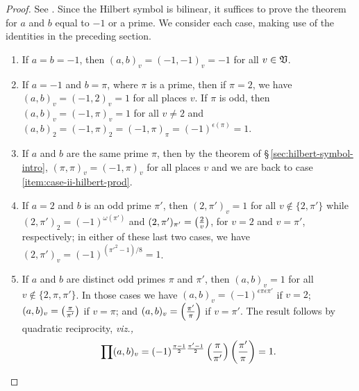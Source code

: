 \begin{proof}
    See \cite[p.~23]{weismann2006annotations}. Since the Hilbert symbol is
    bilinear, it suffices to prove the theorem for \(a\) and \(b\) equal to
    \(-1\) or a prime. We consider each case, making use of the identities in
    the preceding section.

    \smallskip

    \begin{enumerate}[nosep, label=(\roman*), wide]
        \item If \(a = b = -1\), then \((a, b)_v = (-1, -1)_v = -1\) for all \(v
        \in \mathfrak{V}\).
        \item If \(a = -1\) and \(b = \pi\), where \(\pi\) is a prime, then if
        \(\pi = 2\), we have \((a, b)_v = (-1, 2)_v = 1\) for all places \(v\).
        If \(\pi\) is odd, then \((a, b)_v = (-1, \pi)_v = 1\) for all \(v \neq
        2\) and \((a, b)_2 = (-1, \pi)_2 = (-1, \pi)_{\pi} =
        (-1)^{\epsilon(\pi)} = 1\).\label{item:case-ii-hilbert-prod}
        \item If \(a\) and \(b\) are the same prime \(\pi\), then by the theorem
        of \S\,\ref{sec:hilbert-symbol-intro}, \((\pi, \pi)_v = (-1, \pi)_v\)
        for all places \(v\) and we are back to case
        \ref{item:case-ii-hilbert-prod}.
        \item If \(a = 2\) and \(b\) is an odd prime \(\pi'\), then \((2,
        \pi')_v = 1\) for all \(v \notin \{2, \pi'\}\) while \((2, \pi')_2 =
        (-1)^{\omega(\pi')}\) and \((2, \pi')_{\pi'} = \left(\frac{2}{v}\right)\), for
        \(v = 2\) and \(v = \pi'\), respectively; in either of these last two
        cases, we have \((2, \pi')_v = (-1)^{(\pi'^2 - 1)/8} = 1\).
        \item If \(a\) and \(b\) are distinct odd primes \(\pi\) and \(\pi'\),
        then \((a,b)_v = 1\) for all \(v \notin \{2, \pi, \pi'\}\). In those
        cases we have \((a, b)_v = (-1)^{\epsilon{\pi}\epsilon{\pi'}}\) if \(v =
        2\); \((a, b)_v = \left(\frac{\pi}{\pi'}\right)\) if \(v = \pi\); and \((a, b)_v
        = \left(\frac{\pi'}{\pi}\right)\) if \(v = \pi'\). The result follows by
        quadratic reciprocity, \emph{viz.,}
        \[
            \prod (a, b)_v =  (-1)^{\frac{\pi-1}{2}\frac{\pi'-1}{2}} \left(\frac{\pi}{\pi'}\right) \left(\frac{\pi'}{\pi}\right) = 1.
        \]
    \end{enumerate}
\end{proof}


